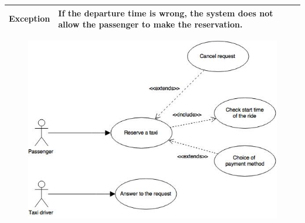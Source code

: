 \documentclass[18pt,oneside,a4paper, titlepage]{article}
\begin{document}
\begin{itemize}
\begin{center}
\begin{tabular}{|c|p{8cm}|}
						\hline \textbf{Exception} & If the departure time is wrong, the system does not allow the passenger to make the reservation.\\
						\hline
					\end{tabular}
					\vspace{1cm}
					\begin{figure}[h]
						\centering
						\includegraphics[scale=0.6]{UseCaseReserve.jpg}
					\end{figure}
				\end{center}
				
				\newpage
				

\end{itemize}
\end{document}
